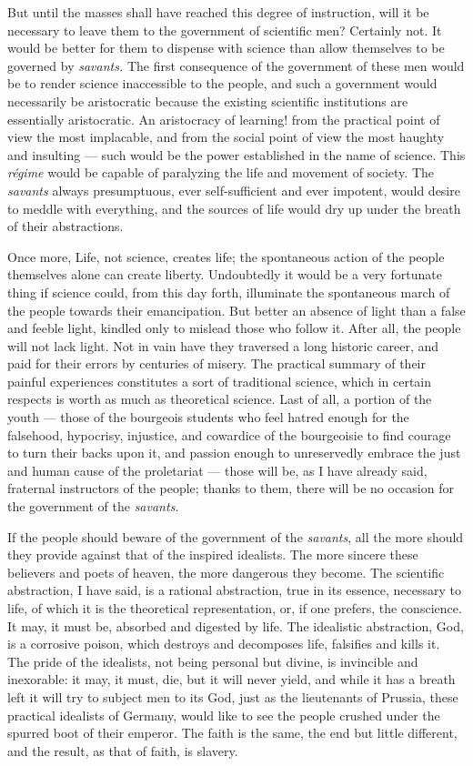 \documentclass[12pt]{report}
\begin{document}
But until the masses shall have reached this degree of instruction, will it be necessary to leave them to the government of scientific men? Certainly not. It would be better for them to dispense with science than allow themselves to be governed by \emph{savants.} The first consequence of the government of these men would be to render science inaccessible to the people, and such a government would necessarily be aristocratic because the existing scientific institutions are essentially aristocratic. An aristocracy of learning! from the practical point of view the most implacable, and from the social point of view the most haughty and insulting — such would be the power established in the name of science. This \emph{régime} would be capable of paralyzing the life and movement of society. The \emph{savants} always presumptuous, ever self-sufficient and ever impotent, would desire to meddle with everything, and the sources of life would dry up under the breath of their abstractions.


Once more, Life, not science, creates life; the spontaneous action of the people themselves alone can create liberty. Undoubtedly it would be a very fortunate thing if science could, from this day forth, illuminate the spontaneous march of the people towards their emancipation. But better an absence of light than a false and feeble light, kindled only to mislead those who follow it. After all, the people will not lack light. Not in vain have they traversed a long historic career, and paid for their errors by centuries of misery. The practical summary of their painful experiences constitutes a sort of traditional science, which in certain respects is worth as much as theoretical science. Last of all, a portion of the youth — those of the bourgeois students who feel hatred enough for the falsehood, hypocrisy, injustice, and cowardice of the bourgeoisie to find courage to turn their backs upon it, and passion enough to unreservedly embrace the just and human cause of the proletariat — those will be, as I have already said, fraternal instructors of the people; thanks to them, there will be no occasion for the government of the \emph{savants.}


If the people should beware of the government of the \emph{savants}, all the more should they provide against that of the inspired idealists. The more sincere these believers and poets of heaven, the more dangerous they become. The scientific abstraction, I have said, is a rational abstraction, true in its essence, necessary to life, of which it is the theoretical representation, or, if one prefers, the conscience. It may, it must be, absorbed and digested by life. The idealistic abstraction, God, is a corrosive poison, which destroys and decomposes life, falsifies and kills it. The pride of the idealists, not being personal but divine, is invincible and inexorable: it may, it must, die, but it will never yield, and while it has a breath left it will try to subject men to its God, just as the lieutenants of Prussia, these practical idealists of Germany, would like to see the people crushed under the spurred boot of their emperor. The faith is the same, the end but little different, and the result, as that of faith, is slavery.
\end{document}
